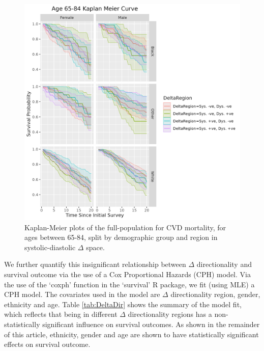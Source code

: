 \documentclass[
]{article}
\begin{document}
\begin{figure}
\centering
\includegraphics{./Rmarkdown_Plots/SurvProbKM_Delta_65-85.png}
\caption{Kaplan-Meier plots of the full-population for CVD mortality, for ages between 65-84, split by demographic group and region in systolic-diastolic \(\Delta\) space.}\label{fig:KM65_deltaregion}
\end{figure}

We further quantify this insignificant relationship between \(\Delta\) directionality and survival outcome via the use of a Cox Proportional Hazards (CPH) model. Via the use of the `coxph' function in the `survival' R package, we fit (using MLE) a CPH model. The covariates used in the model are \(\Delta\) directionality region, gender, ethnicity and age. Table \ref{tab:DeltaDir} shows the summary of the model fit, which reflects that being in different \(\Delta\) directionality regions has a non-statistically significant influence on survival outcomes. As shown in the remainder of this article, ethnicity, gender and age are shown to have statistically significant effects on survival outcome.
\end{document}
